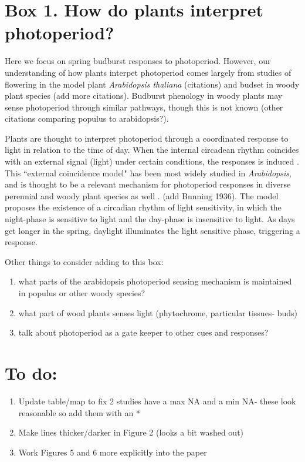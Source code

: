 \documentclass{article}
\begin{document}
\section{Box 1. How do plants interpret photoperiod? }
\par Here we focus on spring budburst responses to photoperiod. However, our understanding of how plants interpet photoperiod comes largely from studies of flowering in the model plant \emph{Arabidopsis thaliana} (citations) and budset in woody plant species \citep{Howe:1996} (add more citations). Budburst phenology in woody plants may sense photoperiod through similar pathways, though this is not known \citep{lagercrantz2009}(other citations comparing populus to arabidopsis?). 
\par Plants are thought to interpret photoperiod through a coordinated response to light in relation to the time of day. When the internal circadean rhythm coincides with an external signal (light) under certain conditions, the responses is induced \citep{lagercrantz2009}. This ``external coincidence model" has been most widely studied in \emph{Arabidopsis}, and is thought to be a relevant mechanism for photoperiod responses in diverse perennial and woody plant species as well \citep{davis2002,petterle2013,bastow2002,kobayashi2007,andres2012,Singh:2017}. (add Bunning 1936). The model proposes the existence of a circadian rhythm of light sensitivity, in which the night-phase is sensitive to light and the day-phase is insensitive to light. As days get longer in the spring, daylight illuminates the  light sensitive phase, triggering a response.%


\par Other things to consider adding to this box:
\begin{enumerate}
\item what parts of the arabidopsis photoperiod sensing mechanism is maintained in populus or other woody species?
\item what part of wood plants senses light (phytochrome, particular tissues- buds)
\item talk about photoperiod as a gate keeper to other cues and responses?
\end{enumerate}


\section* {To do:}
\begin{enumerate}
\item Update table/map to fix 2 studies have a max NA and a min NA- these look reasonable so add them with an *
\item Make lines thicker/darker in Figure 2 (looks a bit washed out)
\item Work Figures 5 and 6 more explicitly into the paper
\end{enumerate}
\end{document}

